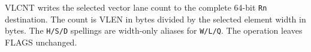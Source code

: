 VLCNT writes the selected vector lane count to the complete 64-bit \texttt{Rn}
destination.  The count is VLEN in bytes divided by the selected element width
in bytes.  The \texttt{H/S/D} spellings are width-only aliases for
\texttt{W/L/Q}.  The operation leaves FLAGS unchanged.
